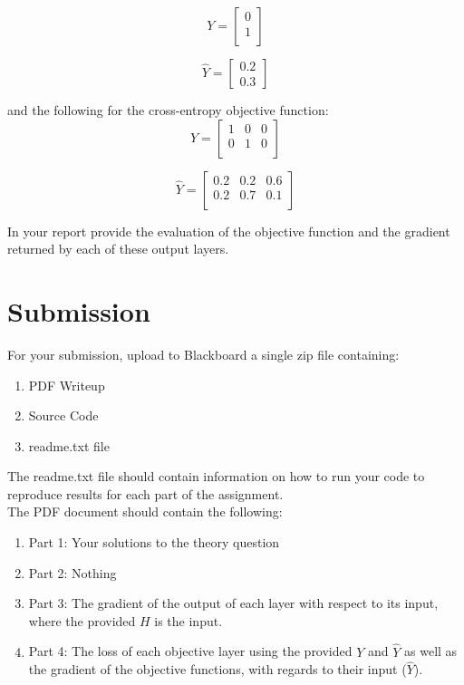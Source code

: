 \documentclass[12pt]{article}
\begin{document}
 $$Y=\begin{bmatrix}
0\\
1\\
\end{bmatrix}$$ 

$$\hat{Y}=\begin{bmatrix}0.2\\0.3\end{bmatrix}$$
 
\noindent
and the following for the cross-entropy objective function:
$$Y=\begin{bmatrix}
1 & 0 & 0\\
0 & 1 & 0\\
\end{bmatrix}$$

$$\hat{Y}=\begin{bmatrix}
0.2 & 0.2 & 0.6\\
0.2 & 0.7 & 0.1\\
\end{bmatrix}$$

\noindent
In your report provide the evaluation of the objective function and the gradient returned by each of these output layers.

\newpage
\section*{Submission}
For your submission, upload to Blackboard a single zip file containing:

\begin{enumerate}
\item PDF Writeup
\item Source Code
\item readme.txt file
\end{enumerate}

\noindent
The readme.txt file should contain information on how to run your code to reproduce results for each part of the assignment.\\

\noindent
The PDF document should contain the following:

\begin{enumerate}
\item Part 1:  Your solutions to the theory question
\item Part 2:  Nothing
\item Part 3: The gradient of the output of each layer with respect to its input, where the provided $H$ is the input.
\item Part 4: The loss of each objective layer using the provided $Y$ and $\hat{Y}$ as well as the gradient of the objective functions, with regards to their input ($\hat{Y}$). 
\end{enumerate}
\end{document}
